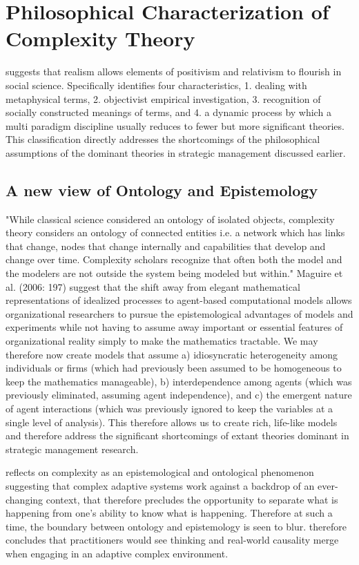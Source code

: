 \documentclass[12pt]{article}
\begin{document}
\section{Philosophical Characterization of Complexity Theory}\label{S:PhilosophicalFoundationComplexity}
 \cite{Mckelvey2011} suggests that realism allows elements of positivism and relativism to flourish in social science. Specifically \cite{Mckelvey2011} identifies four characteristics, 1. dealing with metaphysical terms, 2. objectivist empirical investigation, 3. recognition of socially constructed meanings of terms, and 4. a dynamic process by which a multi paradigm discipline usually reduces to fewer but more significant theories. This classification directly addresses the shortcomings of the philosophical assumptions of the dominant theories in strategic management discussed earlier.

\subsection{A new view of Ontology and Epistemology}

"While classical science considered an ontology of isolated objects, complexity theory considers an ontology of connected entities i.e. a network which has links that change, nodes that change internally and capabilities that develop and change over time.  Complexity scholars recognize that often both the model and the modelers are not outside the system being modeled but within." Maguire et al. (2006: 197) suggest that the shift away from elegant mathematical representations of idealized processes to agent-based computational models allows organizational researchers to pursue the epistemological advantages of models and experiments while not having to assume away important or essential features of organizational reality simply to make the mathematics tractable. We may therefore now create models that assume a) idiosyncratic heterogeneity among individuals or firms (which had previously been assumed to be homogeneous to keep the mathematics manageable), b) interdependence among agents (which was previously eliminated, assuming agent independence), and c) the emergent nature of agent interactions (which was previously ignored to keep the variables at a single level of analysis). This therefore allows us to create rich, life-like models and therefore address the significant shortcomings of extant theories dominant in strategic management research.

\cite{Eoyang2011} reflects on complexity as an epistemological and ontological phenomenon suggesting that complex adaptive systems work against a backdrop of an ever-changing context, that therefore precludes the opportunity to separate what is happening from one's ability to know what is happening. Therefore at such a time, the boundary between ontology and epistemology is seen to blur. \cite{Eoyang2011} therefore concludes that practitioners would see thinking and real-world causality merge when engaging in an adaptive complex environment.
\end{document}

